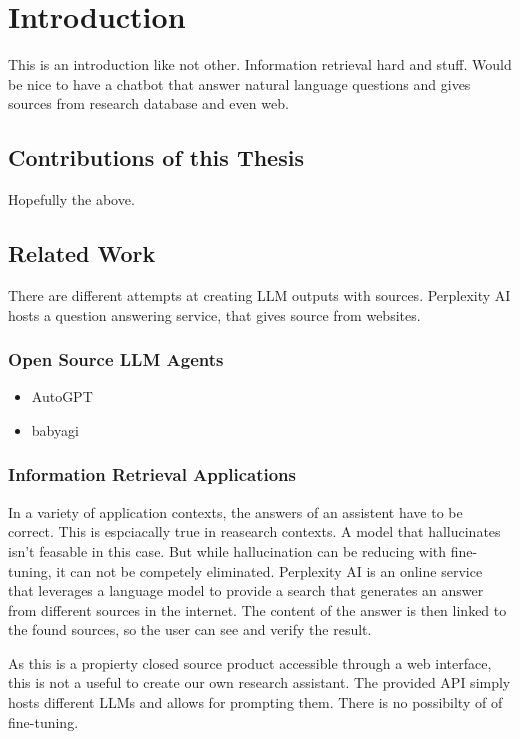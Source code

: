 \documentclass[english, version-2022-01]{uzl-thesis}
\begin{document}
\chapter{Introduction}

This is an introduction like not other. Information retrieval hard and stuff. Would be nice to have a chatbot that answer natural language questions and gives sources from research database and even web.

\section{Contributions of this Thesis}

Hopefully the above.

\section{Related Work}

There are different attempts at creating LLM outputs with sources. Perplexity AI hosts a question answering service, that gives source from websites.

\subsection{Open Source LLM Agents}
\begin{itemize}
	\item AutoGPT
	\item babyagi
\end{itemize}
\subsection{Information Retrieval Applications}

In a variety of application contexts, the answers of an assistent have to be correct. This is espciacally true in reasearch contexts. A model that hallucinates isn't feasable in this case. But while hallucination can be reducing with fine-tuning, it can not be competely eliminated. Perplexity AI is an online service that leverages a language model to provide a search that generates an answer from different sources in the internet. The content of the answer is then linked to the found sources, so the user can see and verify the result.

As this is a propierty closed source product accessible through a web interface, this is not a useful to create our own research assistant. The provided API simply hosts different LLMs and allows for prompting them. There is no possibilty of of fine-tuning.
\end{document}

